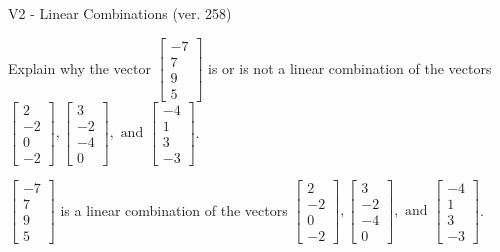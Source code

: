 \begin{exercise}
  \begin{exerciseTitle}V2 - Linear Combinations (ver. 258)\end{exerciseTitle}
  \begin{exerciseStatement}
    Explain why the vector \(\left[\begin{array}{c}
-7 \\
7 \\
9 \\
5
\end{array}\right]\)  is or is not a linear 
	combination of the vectors \(\left[\begin{array}{c}
2 \\
-2 \\
0 \\
-2
\end{array}\right] , \left[\begin{array}{c}
3 \\
-2 \\
-4 \\
0
\end{array}\right] , \text{ and } \left[\begin{array}{c}
-4 \\
1 \\
3 \\
-3
\end{array}\right]\).
	


  \end{exerciseStatement}
  \begin{exerciseAnswer}
   \(\left[\begin{array}{c}
-7 \\
7 \\
9 \\
5
\end{array}\right]\) 
  	 is  
	a linear combination of the vectors \(\left[\begin{array}{c}
2 \\
-2 \\
0 \\
-2
\end{array}\right] , \left[\begin{array}{c}
3 \\
-2 \\
-4 \\
0
\end{array}\right] , \text{ and } \left[\begin{array}{c}
-4 \\
1 \\
3 \\
-3
\end{array}\right]\).

	
  


  \end{exerciseAnswer}
\end{exercise}